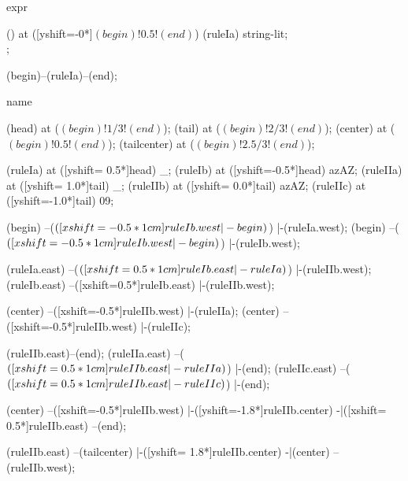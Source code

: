 \begin{syntax}{expr}
  
  \node[sequence] () at ([yshift=-0*\syntaxruledist]$(begin)!0.5!(end)$) {
    \node[nonterminal]    (ruleIa) {string-lit};
    \\
  };
  
  \draw[path] (begin)--(ruleIa)--(end);
\end{syntax}
\begin{syntax}{name}
  
  \coordinate (head) at ($(begin)!1/3!(end)$);
  \coordinate (tail) at ($(begin)!2/3!(end)$);
  \coordinate (center) at ($(begin)!0.5!(end)$);
  \coordinate (tailcenter) at ($(begin)!2.5/3!(end)$);
  
  \node[terminal]    (ruleIa) at ([yshift= 0.5*\syntaxruledist]head) {\_};
  \node[nonterminal] (ruleIb) at ([yshift=-0.5*\syntaxruledist]head) {azAZ};
  \node[terminal]    (ruleIIa) at ([yshift= 1.0*\syntaxruledist]tail) {\_};
  \node[nonterminal] (ruleIIb) at ([yshift= 0.0*\syntaxruledist]tail) {azAZ};
  \node[nonterminal] (ruleIIc) at ([yshift=-1.0*\syntaxruledist]tail) {09};
  
  \draw[path] (begin)
            --($([xshift=-0.5*1cm]ruleIb.west |- begin)$)
            |-(ruleIa.west);
  \draw[path] (begin)
            --($([xshift=-0.5*1cm]ruleIb.west |- begin)$)
            |-(ruleIb.west);
  
  \draw[path] (ruleIa.east)
            --($([xshift=0.5*1cm]ruleIb.east |- ruleIa)$)
            |-(ruleIIb.west);
  \draw[path] (ruleIb.east)
            --([xshift=0.5*\syntaxruledist]ruleIb.east)
            |-(ruleIIb.west);
  
  \draw[path] (center)
            --([xshift=-0.5*\syntaxruledist]ruleIIb.west)
            |-(ruleIIa);
  \draw[path] (center)
            --([xshift=-0.5*\syntaxruledist]ruleIIb.west)
            |-(ruleIIc);
  
  \draw[path] (ruleIIb.east)--(end);
  \draw[path] (ruleIIa.east)
            --($([xshift=0.5*1cm]ruleIIb.east |- ruleIIa)$)
            |-(end);
  \draw[path] (ruleIIc.east)
            --($([xshift=0.5*1cm]ruleIIb.east |- ruleIIc)$)
            |-(end);
  
  \draw[path] (center)
            --([xshift=-0.5*\syntaxruledist]ruleIIb.west)
            |-([yshift=-1.8*\syntaxruledist]ruleIIb.center)
            -|([xshift= 0.5*\syntaxruledist]ruleIIb.east)
            --(end);
  
  \draw[path] (ruleIIb.east)
            --(tailcenter)
            |-([yshift= 1.8*\syntaxruledist]ruleIIb.center)
            -|(center)
            --(ruleIIb.west);
  
\end{syntax}
